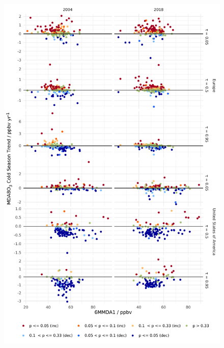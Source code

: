 \documentclass{article}
\begin{document}
\begin{figure}[p]
\centering
\includegraphics[height=0.75\textheight]{figures/si_figures/fS24_mda8_cold_sig_mda8_6mmda1.pdf}
\caption{}
\label{si_fig:mda8_cold_sig_mda8_6mmda1}
\end{figure}
\clearpage


\end{document}
